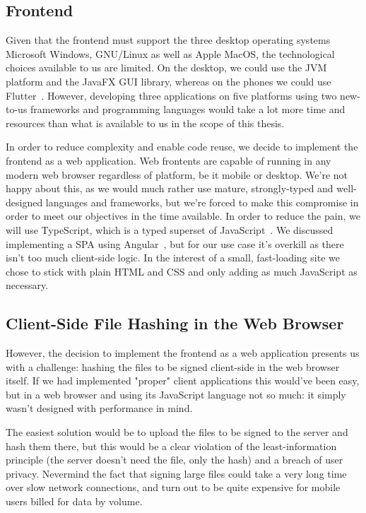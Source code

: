 \subsection{Frontend}
\label{subsec:techfrontend}

Given that the frontend must support the three desktop operating systems Microsoft Windows,
GNU/Linux as well as Apple MacOS,
the technological choices available to us are limited.
On the desktop, we could use the \gls{JVM} platform and the JavaFX \gls{GUI} library, whereas on the phones
we could use Flutter~\cite{flutterframework}.
However, developing three applications on five platforms using two new-to-us frameworks and programming languages
would take a lot more time and resources than what is available to us in the scope of this thesis.

In order to reduce complexity and enable code reuse, we decide to implement the frontend as a web application.
Web frontents are capable of running in any modern web browser regardless of platform, be it mobile or desktop.
We're not happy about this, as we would much rather use mature, strongly-typed and well-designed languages and frameworks,
but we're forced to make this compromise in order to meet our objectives in the time available.
In order to reduce the pain, we will use TypeScript, which is a typed superset of JavaScript~\cite{loltypes}.
We discussed implementing a \gls{SPA} using Angular~\cite{angular},
but for our use case it's overkill as there isn't too much client-side logic.
In the interest of a small, fast-loading site we chose to stick with plain \gls{HTML} and \gls{CSS}
and only adding as much JavaScript as necessary.

\subsection{Client-Side File Hashing in the Web Browser}
\label{subsec:browserhashing}
However, the decision to implement the frontend as a web application presents us with a challenge:
hashing the files to be signed client-side in the web browser itself.
If we had implemented "proper" client applications this would've been easy, but in a web browser and using its
JavaScript language not so much: it simply wasn't designed with performance in mind.

The easiest solution would be to upload the files to be signed to the server and hash them there,
but this would be a clear violation of the least-information principle (the server doesn't need the file, only the hash)
and a breach of user privacy.
Nevermind the fact that signing large files could take a very long time over slow network connections,
and turn out to be quite expensive for mobile users billed for data by volume.

